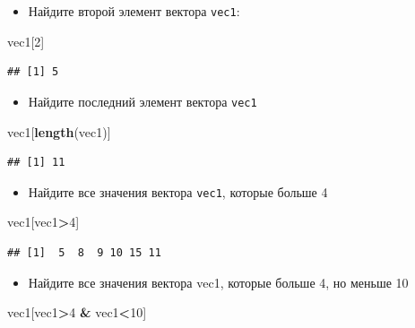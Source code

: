 \documentclass[]{book}
\newenvironment{Shaded}{\begin{snugshade}}{\end{snugshade}}
\newcommand{\KeywordTok}[1]{\textcolor[rgb]{0.13,0.29,0.53}{\textbf{#1}}}
\newcommand{\DecValTok}[1]{\textcolor[rgb]{0.00,0.00,0.81}{#1}}
\newcommand{\StringTok}[1]{\textcolor[rgb]{0.31,0.60,0.02}{#1}}
\newcommand{\OperatorTok}[1]{\textcolor[rgb]{0.81,0.36,0.00}{\textbf{#1}}}
\newcommand{\NormalTok}[1]{#1}
\providecommand{\tightlist}{%
  \setlength{\itemsep}{0pt}\setlength{\parskip}{0pt}}
\begin{document}
\begin{itemize}
\tightlist
\item
  Найдите второй элемент вектора \texttt{vec1}:
\end{itemize}

\begin{Shaded}
\begin{Highlighting}[]
\NormalTok{vec1[}\DecValTok{2}\NormalTok{]}
\end{Highlighting}
\end{Shaded}

\begin{verbatim}
## [1] 5
\end{verbatim}

\begin{itemize}
\tightlist
\item
  Найдите последний элемент вектора \texttt{vec1}
\end{itemize}

\begin{Shaded}
\begin{Highlighting}[]
\NormalTok{vec1[}\KeywordTok{length}\NormalTok{(vec1)]}
\end{Highlighting}
\end{Shaded}

\begin{verbatim}
## [1] 11
\end{verbatim}

\begin{itemize}
\tightlist
\item
  Найдите все значения вектора \texttt{vec1}, которые больше 4
\end{itemize}

\begin{Shaded}
\begin{Highlighting}[]
\NormalTok{vec1[vec1}\OperatorTok{>}\DecValTok{4}\NormalTok{]}
\end{Highlighting}
\end{Shaded}

\begin{verbatim}
## [1]  5  8  9 10 15 11
\end{verbatim}

\begin{itemize}
\tightlist
\item
  Найдите все значения вектора vec1, которые больше 4, но меньше 10
\end{itemize}

\begin{Shaded}
\begin{Highlighting}[]
\NormalTok{vec1[vec1}\OperatorTok{>}\DecValTok{4} \OperatorTok{&}\StringTok{ }\NormalTok{vec1}\OperatorTok{<}\DecValTok{10}\NormalTok{]}
\end{Highlighting}
\end{Shaded}
\end{document}
